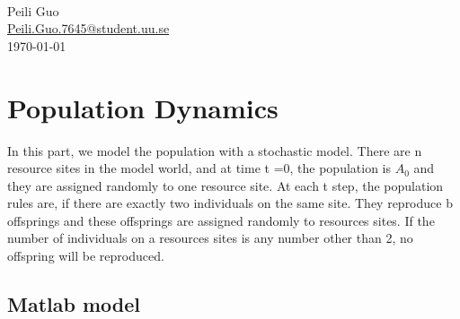 \documentclass[12pt]{article}
\begin{document}
\begin{titlepage}
\HRule \\[0.4cm]

 

{\huge Peili Guo\\} %
{\large \href{mailto:Peili.Guo.7645@student.uu.se}{Peili.Guo.7645@student.uu.se}}
\\[2cm] %


{\Large \today}\\[2cm] %



\vfill %

\end{titlepage}

\newpage

\section{Population Dynamics}
\doublespacing
In this part, we model the population with a stochastic model. There are n resource sites in the model world, and at time t =0, the population is $A_{0}$ and they are assigned randomly to one resource site. At each t step, the population rules are, if there are exactly two individuals on the same site. They reproduce b offsprings and these offsprings are assigned randomly to resources sites. If the number of individuals on a resources sites is any number other than 2, no offspring will be reproduced. 

\subsection{Matlab model}
\end{document}
